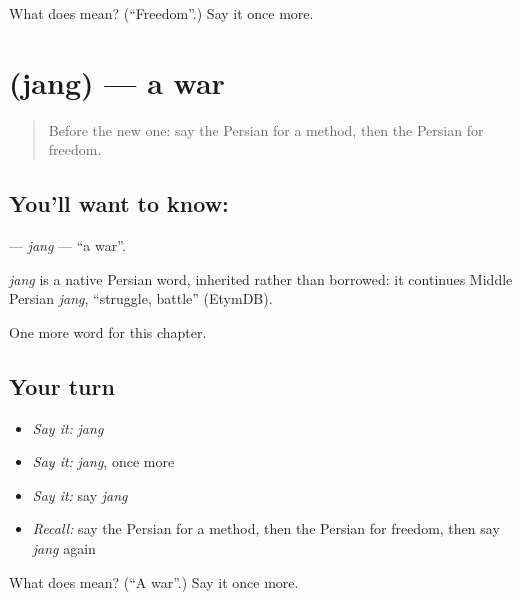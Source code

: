 \begin{tcolorbox}[breakable,colback=teal!4,colframe=teal!35!black,title={Before you move on}]
What does  mean? (\textquotedblleft{}Freedom\textquotedblright{}.) Say it once more.
\end{tcolorbox}
\section[\texorpdfstring{\fa{جنگ} (jang)}{جنگ (jang)}]{ (jang) — a war}

\label{lesson:FA-C234-jang}



\begin{quote}
Before the new one: say the Persian for a method, then the Persian for freedom.
\end{quote}

\subsection*{You'll want to know: }
\textbf{} — \emph{jang} — \textquotedblleft{}a war\textquotedblright{}.

\begin{cousinweb}
\emph{jang} is a native Persian word, inherited rather than borrowed: it continues Middle Persian \emph{jang}, \textquotedblleft{}struggle, battle\textquotedblright{} (EtymDB).
\end{cousinweb}

\begin{grammarlens}[title={What you've built}]
One more word for this chapter.
\end{grammarlens}

\subsection*{Your turn}
\begin{itemize}
\raggedright
  \item \emph{Say it:} \emph{jang}
  \item \emph{Say it:} \emph{jang}, once more
  \item \emph{Say it:} say \emph{jang}
  \item \emph{Recall:} say the Persian for a method, then the Persian for freedom, then say \emph{jang} again
\end{itemize}

\begin{tcolorbox}[breakable,colback=teal!4,colframe=teal!35!black,title={Before you move on}]
What does  mean? (\textquotedblleft{}A war\textquotedblright{}.) Say it once more.
\end{tcolorbox}
